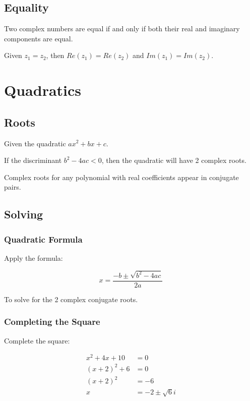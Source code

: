 \documentclass[a4paper,11pt]{article}
\begin{document}
\subsection{Equality}

Two complex numbers are equal if and only if both their real and imaginary
components are equal.

Given $z_1 = z_2$, then $Re(z_1) = Re(z_2)$ and $Im(z_1) = Im(z_2)$.




\section{Quadratics}

\subsection{Roots}

Given the quadratic $ax^2 + bx + c$.

If the discriminant $b^2 - 4ac < 0$, then the quadratic will have 2 complex
roots.

Complex roots for any polynomial with real coefficients appear in conjugate
pairs.


\subsection{Solving}

\subsubsection{Quadratic Formula}

Apply the formula:

$$
x = \frac{-b \pm \sqrt{b^2 - 4ac}}{2a}
$$

To solve for the 2 complex conjugate roots.


\subsubsection{Completing the Square}

Complete the square:

$$
\begin{aligned}
x^2 + 4x + 10 & = 0 \\
(x + 2)^2 + 6 & = 0 \\
(x + 2)^2 & = -6 \\
x & = -2 \pm \sqrt{6}i
\end{aligned}
$$
\end{document}
